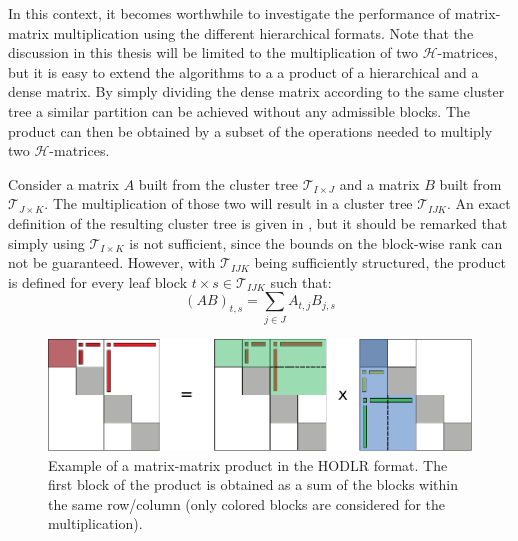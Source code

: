 \noindent In this context, it becomes worthwhile to investigate the performance of matrix-matrix multiplication using the different hierarchical formats. Note that the discussion in this thesis will be limited to the multiplication of two $\mathcal{H}$-matrices, but it is easy to extend the algorithms to a a product of a hierarchical and a dense matrix. By simply dividing the dense matrix according to the same cluster tree a similar partition can be achieved without any admissible blocks. The product can then be obtained by a subset of the operations needed to multiply two $\mathcal{H}$-matrices.

Consider a matrix $A$ built from the cluster tree $\mathcal{T}_{I\times J}$ and a matrix $B$ built from $\mathcal{T}_{J\times K}$. The multiplication of those two will result in a cluster tree $\mathcal{T}_{IJK}$. An exact definition of the resulting cluster tree is given in \cite{bebendorf_hierarchical_2008}, but it should be remarked that simply using $\mathcal{T}_{I\times K}$ is not sufficient, since the bounds on the block-wise rank can not be guaranteed. However, with $\mathcal{T}_{IJK}$ being sufficiently structured, the product is defined for every leaf block $t \times s \in \mathcal{T}_{IJK}$ such that:
\begin{equation}
    (AB)_{t,s} = \sum_{j \in J}A_{t,j}B_{j,s}
\end{equation}

\begin{figure}[h]
    \centering
    \includegraphics[width=\linewidth]{chapters/4_hierarchical_matrices/figures/matmul.pdf}
    \caption[Hierarchical Matrix-Matrix Product]{Example of a matrix-matrix product in the HODLR format. The first block of the product is obtained as a sum of the blocks within the same row/column (only colored blocks are considered for the multiplication).}
    \label{fig:matmul}
\end{figure}

